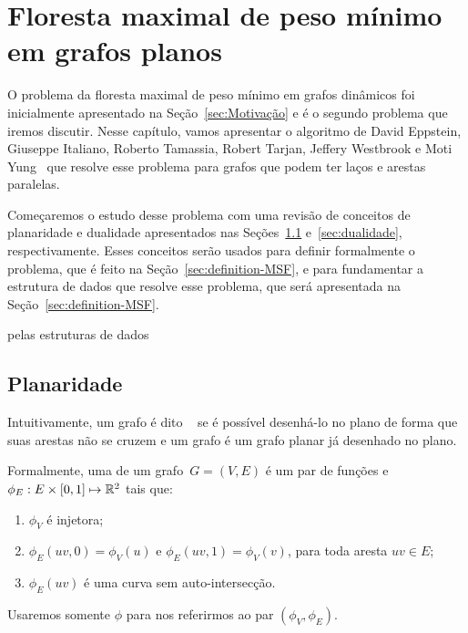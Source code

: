 \chapter{Floresta maximal de peso mínimo em grafos planos}
\label{sec:MSF}

O problema da floresta maximal de peso mínimo em grafos dinâmicos foi inicialmente apresentado na Seção~\ref{sec:Motivação} e é o segundo problema que iremos discutir.
Nesse capítulo, vamos apresentar o algoritmo de David Eppstein, Giuseppe Italiano, Roberto Tamassia, Robert Tarjan, Jeffery Westbrook e Moti Yung~\cite{EPPSTEIN-planar} que resolve esse problema para grafos que podem ter laços e arestas paralelas.

Começaremos o estudo desse problema com uma revisão de conceitos de planaridade e dualidade apresentados nas Seções~\ref{sec:planaridade} e~\ref{sec:dualidade}, respectivamente.
Esses conceitos serão usados para definir formalmente o problema, que é feito na Seção~\ref{sec:definition-MSF}, e para fundamentar a estrutura de dados que resolve esse problema, que será apresentada na Seção~\ref{sec:definition-MSF}.


  pelas estruturas de dados 


\section{Planaridade}
\label{sec:planaridade}

Intuitivamente, um grafo é dito ~\cite{planarTheoryAlgorith} se é possível desenhá-lo no plano de forma que suas arestas não se cruzem e um grafo  é um grafo planar já desenhado no plano.

Formalmente, uma  de um grafo~$G=(V,E)$ é um par de funções  e $\phi_E: E\times [0,1]\mapsto \mathbb{R}^2$ tais que:
\begin{enumerate}
\item $\phi_V$ é injetora; 
\item $\phi_E(uv,0) = \phi_V(u)$ e $\phi_E(uv,1) = \phi_V(v)$, para toda aresta $uv\in E$;
\item $\phi_E(uv)$ é uma curva sem auto-intersecção.
\end{enumerate}
Usaremos somente $\phi$ para nos referirmos ao par $(\phi_V,\phi_E)$.

